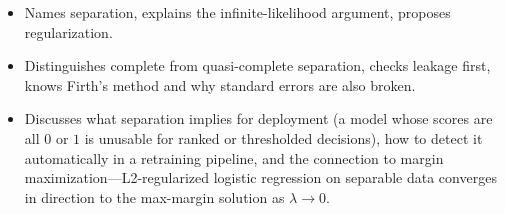 \begin{interviewq}

\goodgreat
\begin{itemize}
    \item {} Names separation, explains the infinite-likelihood argument, proposes regularization.
    \item {} Distinguishes complete from quasi-complete separation, checks leakage first, knows Firth's method and why standard errors are also broken.
    \item {} Discusses what separation implies for deployment (a model whose scores are all $0$ or $1$ is unusable for ranked or thresholded decisions), how to detect it automatically in a retraining pipeline, and the connection to margin maximization---L2-regularized logistic regression on separable data converges in direction to the max-margin solution as $\lambda\to0$.
\end{itemize}

\end{interviewq}

